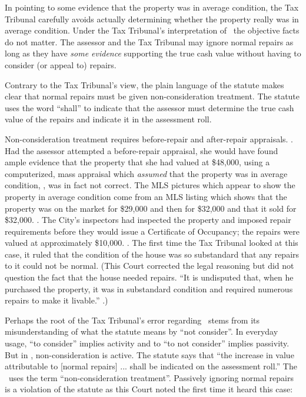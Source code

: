 \documentclass[12pt,\documentclassflag]{michiganCourtOfAppealsBrief}
\begin{document}
In pointing to some evidence that the property was in average condition, the Tax Tribunal carefully avoids actually determining whether the property really was in average condition. Under the Tax Tribunal's interpretation of \mathieuGast\ the objective facts do not matter. The assessor and the Tax Tribunal may ignore normal repairs as long as they have \textit{some evidence} supporting the true cash value without having to consider (or appeal to) repairs.

Contrary to the Tax Tribunal's view, the plain language of the statute makes clear that normal repairs must be given non-consideration treatment. The statute uses the word ``shall'' to indicate that the assessor must determine the true cash value of the repairs and indicate it in the assessment roll.

Non-consideration treatment requires before-repair and after-repair appraisals. . Had the assessor attempted a before-repair appraisal, she would have found ample evidence that the property that she had valued at \$48,000, using a computerized, mass appraisal which \textit{assumed} that the property was in average condition, \foj[4], was in fact not correct. The MLS pictures which appear to show the property in average condition come from an MLS listing which shows that the property was on the market for \$29,000 and then for \$32,000 and that it sold for \$32,000. \mlsHistory[]. The City's inspectors had inspected the property and imposed repair requirements before they would issue a Certificate of Occupancy; the repairs were valued at approximately \$10,000. \repairs. The first time the Tax Tribunal looked at this case, it ruled that the condition of the house was so substandard that any repairs to it could not be normal. (This Court corrected the legal reasoning but did not question the fact that the house needed repairs. ``It is undisputed that, when he purchased the property, it was in substandard condition and required numerous repairs to make it livable.'' .)
 
Perhaps the root of the Tax Tribunal's error regarding \mathieuGast\ stems from its misunderstanding of what the statute means by ``not consider''. In everyday usage, ``to consider'' implies activity and to ``to not consider'' implies passivity. But in \mathieuGast, non-consideration is active. The statute says that ``the increase in value attributable to [normal repairs] ... shall be indicated on the assessment roll.'' The \cite[s]{STC Bulletin}\ uses the term ``non-consideration treatment''. Passively ignoring normal repairs is a violation of the statute as this Court noted the first time it heard this case:
\end{document}
